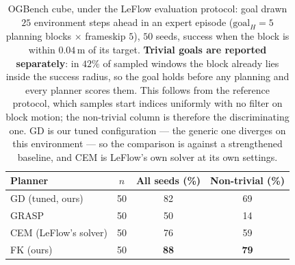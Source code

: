 \begin{table}[h]
  \centering
  \caption{OGBench cube, under the LeFlow evaluation protocol: goal drawn
  $25$ environment steps ahead in an expert episode ($\mathrm{goal}_H=5$
  planning blocks $\times$ frameskip $5$), $50$ seeds, success when the
  block is within $0.04$\,m of its target. \textbf{Trivial goals are
  reported separately}: in $42\%$ of sampled windows the block already
  lies inside the success radius, so the goal holds before any planning
  and every planner scores them. This follows from the reference
  protocol, which samples start indices uniformly with no filter on
  block motion; the non-trivial column is therefore the discriminating
  one. GD is our tuned configuration --- the generic one diverges on
  this environment --- so the comparison is against a strengthened
  baseline, and CEM is LeFlow's own solver at its own settings.}
  \label{tab:cube}
  \begin{tabular}{lccc}
    \toprule
    Planner & $n$ & All seeds (\%) & Non-trivial (\%) \\
    \midrule
    GD (tuned, ours)         &  50 & 82 & 69 \\
    GRASP                    &  50 & 50 & 14 \\
    CEM (LeFlow's solver)    &  50 & 76 & 59 \\
    FK (ours)                &  50 & \textbf{88} & \textbf{79} \\
    \bottomrule
  \end{tabular}
\end{table}
